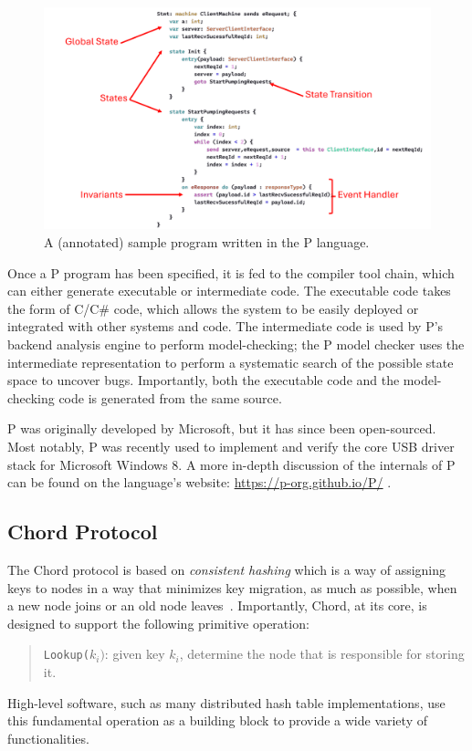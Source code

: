 \documentclass[conference]{IEEEtran}
\begin{document}
\begin{figure}[h]
	\centering
	\includegraphics[width=\linewidth]{p-annotated.png}
	\caption{A (annotated) sample program written in the P language.}
	\label{fig:p-syntax}
\end{figure}

Once a P program has been specified, it is fed to the compiler tool chain, which can either generate executable or intermediate code. The executable code takes the form of C/C\# code, which allows the system to be easily deployed or integrated with other systems and code. The intermediate code is used by P's backend analysis engine to perform model-checking; the P model checker uses the intermediate representation to perform a systematic search of the possible state space to uncover bugs. Importantly, both the executable code and the model-checking code is generated from the same source.

P was originally developed by Microsoft, but it has since been open-sourced. Most notably, P was recently used to implement and verify the core USB driver stack for Microsoft Windows 8. A more in-depth discussion of the internals of P can be found on the language's website: \url{https://p-org.github.io/P/} \cite{p_developers_formal_2023}.



\subsection{Chord Protocol}\label{sec:chord}
The Chord protocol is based on \textit{consistent hashing} which is a way of assigning keys to nodes in a way that minimizes key migration, as much as possible, when a new node joins or an old node leaves~\cite{karger_consistent_1997}. Importantly, Chord, at its core, is designed to support the following primitive operation: 
\begin{quote}
	\texttt{Lookup($k_i)$}: given key $k_i$, determine the node that is responsible for storing it.
\end{quote}
High-level software, such as many distributed hash table implementations, use this fundamental operation as a building block to provide a wide variety of functionalities.
\end{document}
